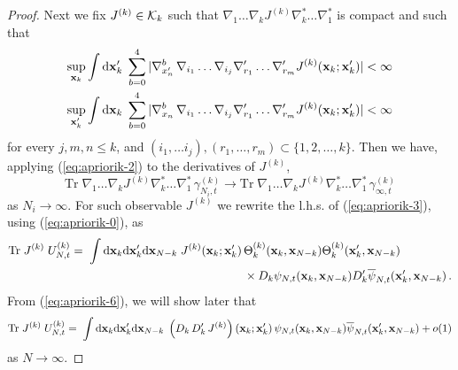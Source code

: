 \documentclass[11pt]{article}
\newcommand{\rd}{{\rm d}}
\newcommand{\bx}{{\bf x}}
\newcommand{\tr}{\mbox{Tr}}
\newcommand{\cK}{{\cal K}}
\begin{document}
\begin{proof}
Next we fix $J^{(k)} \in \cK_k$ such that $\nabla_1 \dots \nabla_k
J^{(k)} \nabla^*_k \dots \nabla^*_1$ is compact and such that
\begin{equation}\label{eq:assump}
\begin{split}
\sup_{\bx_k} \int \rd \bx'_k \; \sum_{b=0}^4|\nabla^b_{x'_n} \,
\nabla_{i_1} \dots \nabla_{i_j} \nabla'_{r_1} \dots \nabla'_{r_m}
J^{(k)} (\bx_k ; \bx'_k) | < \infty \\
\sup_{\bx'_k} \int \rd \bx_k \; \sum_{b=0}^4 |\nabla^b_{x_n} \,
\nabla_{i_1} \dots \nabla_{i_j} \nabla'_{r_1} \dots \nabla'_{r_m}
J^{(k)} (\bx_k ; \bx'_k) | < \infty
\end{split}
\end{equation}
for every $j,m,n \leq k$, and $(i_1, \dots i_j), (r_1,\dots,r_m)
\subset \{ 1,2, \dots,k \}$. Then we have, applying
(\ref{eq:apriorik-2}) to the derivatives of $J^{(k)}$,
\begin{equation}\label{eq:apriorik-4}
\tr \; \nabla_1 \dots \nabla_k J^{(k)} \nabla^*_k \dots \nabla^*_1
\,  \gamma_{N_i ,t}^{(k)} \to \tr \; \nabla_1 \dots \nabla_k J^{(k)}
\nabla^*_k \dots \nabla^*_1 \,  \gamma_{\infty,t}^{(k)}
\end{equation}
as $N_i \to \infty$. For such observable $J^{(k)}$ we rewrite the
l.h.s. of (\ref{eq:apriorik-3}), using (\ref{eq:apriorik-0}), as
\begin{equation}\label{eq:apriorik-6}
\begin{split}
\tr \; J^{(k)} \; U_{N,t}^{(k)} = \; \int \rd \bx_k \rd \bx'_k \rd
\bx_{N-k} \; J^{(k)} (\bx_k ; \bx'_k) \, &\Theta_k^{(k)}
(\bx_k,\bx_{N-k})  \Theta_k^{(k)} (\bx'_k , \bx_{N-k})  \\ &\times
D_k \psi_{N,t} (\bx_k, \bx_{N-k}) D'_k \overline{ \psi}_{N,t}
(\bx'_k, \bx_{N-k})\,.
\end{split}
\end{equation}
{F}rom (\ref{eq:apriorik-6}), we will show later that
\begin{equation}\label{eq:apriorik-7}
\begin{split}
\tr \; J^{(k)} \; U_{N,t}^{(k)} = \; \int \rd \bx_k \rd \bx'_k \rd
\bx_{N-k} \; \left(D_k \, D'_k \, J^{(k)}\right) (\bx_k ; \bx'_k) \,
 \psi_{N,t} (\bx_k, \bx_{N-k}) \overline{ \psi}_{N,t} (\bx'_k,
\bx_{N-k}) + o(1)
\end{split}
\end{equation}
as $N \to \infty$.



\end{proof}
\end{document}
